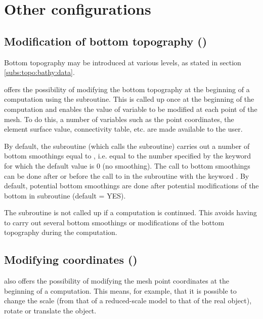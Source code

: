 \chapter{Other configurations}
\label{ch:oth:conf}

\section{Modification of bottom topography ()}
\label{sec:mod:bott:topo}
Bottom topography may be introduced at various levels, as stated
in section \ref{subs:topo:bathy:data}.

 offers the possibility of modifying the bottom topography
at the beginning of a computation using the  subroutine.
This is called up once at the beginning of the computation and enables the value
of variable  to be modified at each point of the mesh.
To do this, a number of variables such as the point coordinates, the element
surface value, connectivity table, etc. are made available to the user.

By default, the  subroutine (which calls the
 subroutine) carries out a number
of bottom smoothings equal to ,
i.e. equal to the number specified by the keyword 
for which the default value is 0 (no smoothing).
The call to bottom smoothings can be done after or before the call to
 in the  subroutine with the keyword
.
By default, potential bottom smoothings are done after potential modifications
of the bottom in  subroutine (default = YES).

The  subroutine is not called up
if a computation is continued.
This avoids having to carry out several bottom smoothings or modifications
of the bottom topography during the computation.


\section{Modifying coordinates ()}

 also offers the possibility of modifying the mesh point coordinates
at the beginning of a computation.
This means, for example, that it is possible to change the scale
(from that of a reduced-scale model to that of the real object),
rotate or translate the object.

